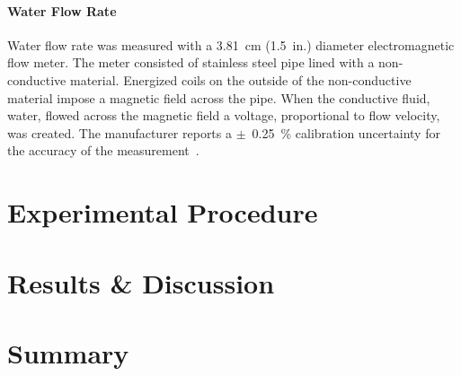 \documentclass[12pt,oneside]{book}
\begin{document}
\subsubsection*{Water Flow Rate}
Water flow rate was measured with a 3.81~cm (1.5~in.) diameter electromagnetic flow meter. The meter consisted of stainless steel pipe lined with a non-conductive material. Energized coils on the outside of the non-conductive material impose a magnetic field across the pipe. When the conductive fluid, water, flowed across the magnetic field a voltage, proportional to flow velocity, was created. The manufacturer reports a $\pm$~0.25~\% calibration uncertainty for the accuracy of the measurement~\cite{Badger:2015}. 

\chapter{Experimental Procedure}
\label{chap:exp_procedure}



\chapter{Results \& Discussion}


\chapter{Summary}




\clearpage

\appendix
\captionsetup{list=no}
\end{document}
